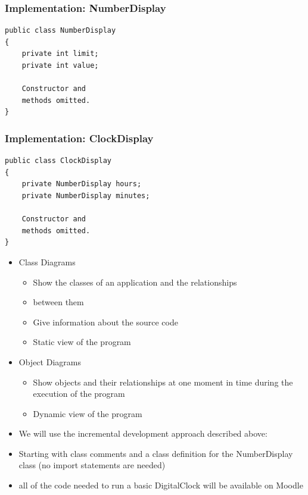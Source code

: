 \documentclass{beamer}
\begin{document}
\begin{frame}[fragile]
\frametitle{Implementation: NumberDisplay}
\begin{lstlisting}[linewidth=6cm]
public class NumberDisplay
{
    private int limit;
    private int value;

    Constructor and
    methods omitted.
}
\end{lstlisting}
\end{frame}

\begin{frame}[fragile]
\frametitle{Implementation: ClockDisplay}
\begin{lstlisting}[linewidth=7cm]
public class ClockDisplay
{
    private NumberDisplay hours;
    private NumberDisplay minutes;

    Constructor and
    methods omitted.
}
\end{lstlisting}
\end{frame}


\begin{frame}

\begin{itemize}
\item Class Diagrams

\begin{itemize}
\item Show the classes of an application and the relationships
\item between them
\item Give information about the source code 
\item Static view of the program
\end{itemize}
\item Object Diagrams

\begin{itemize}
\item Show objects and their relationships at one moment in time during the execution of the program 
\item Dynamic view of the program
\end{itemize}
\end{itemize}

\end{frame}


\begin{frame}[fragile]

\begin{itemize}
\item We will use the incremental development approach described above:
\item Starting with class comments and a class definition for the NumberDisplay class (no import statements are needed)
\item all  of  the code needed to run a basic DigitalClock will be available on Moodle
\end{itemize}
\end{frame}
\end{document}
